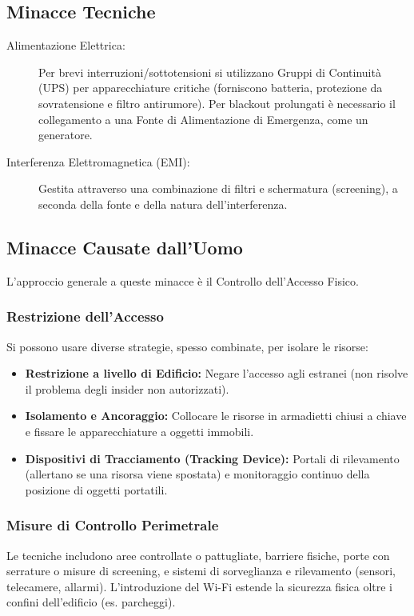 \subsection{Minacce Tecniche}

\begin{description}
    \item[Alimentazione Elettrica:] Per brevi interruzioni/sottotensioni si utilizzano Gruppi di Continuità (UPS) per apparecchiature critiche (forniscono batteria, protezione da sovratensione e filtro antirumore). Per blackout prolungati è necessario il collegamento a una Fonte di Alimentazione di Emergenza, come un generatore.
    \item[Interferenza Elettromagnetica (EMI):] Gestita attraverso una combinazione di filtri e schermatura (screening), a seconda della fonte e della natura dell'interferenza.
\end{description}

\subsection{Minacce Causate dall'Uomo}

L'approccio generale a queste minacce è il Controllo dell'Accesso Fisico.

\subsubsection{Restrizione dell'Accesso}
Si possono usare diverse strategie, spesso combinate, per isolare le risorse:
\begin{itemize}
    \item \textbf{Restrizione a livello di Edificio:} Negare l'accesso agli estranei (non risolve il problema degli insider non autorizzati).
    \item \textbf{Isolamento e Ancoraggio:} Collocare le risorse in armadietti chiusi a chiave e fissare le apparecchiature a oggetti immobili.
    \item \textbf{Dispositivi di Tracciamento (Tracking Device):} Portali di rilevamento (allertano se una risorsa viene spostata) e monitoraggio continuo della posizione di oggetti portatili.
\end{itemize}

\subsubsection{Misure di Controllo Perimetrale}
Le tecniche includono aree controllate o pattugliate, barriere fisiche, porte con serrature o misure di screening, e sistemi di sorveglianza e rilevamento (sensori, telecamere, allarmi). L'introduzione del Wi-Fi estende la sicurezza fisica oltre i confini dell'edificio (es. parcheggi).

